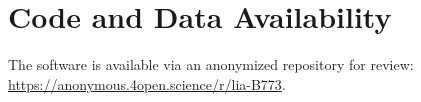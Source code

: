 \documentclass[manuscript]{acm/aamas}
\title{\PaperTitle}
\newcommand{\tool}{MEKH}
\newcommand{\toolname}{Material Evolution Knowledge Hypergraph}
\newcommand{\process}{MP-DNF}
\newcommand{\processname}{Material Processing Dependency Network Framework}
\newif\ifusecoverpage
\newcommand{\PaperAbstract}{%
Supply chain analysis for critical materials often employs top-down methods, tracing backward from finished products. These methods can lack visibility into intermediate dependencies due to proprietary manufacturing and opaque supplier networks. This paper presents a bottom-up agentic AI approach for constructing a ~\toolname{} (\tool{}), an essential building block for supply chain networks that document the transformation of raw materials into advanced technological products.

The approach uses the \processname{} (\process{}), a multi-agent system in which specialized language models iteratively discover, classify, and validate materials and industrial processes. Multiple knowledge sources are integrated via the Model Context Protocol (MCP), including harmonized trade code databases, semantic reference caches, web searches, and structured encyclopedic sources. The resulting networks are represented as directed hypergraphs that capture the multi-input, multi-output nature of industrial processes.

The pipeline begins with seed materials and expands through a documented process, identifying intermediates and transformations, and applying validation based on reference quality. Iterative cycles allow the introduction of new materials, process discovery, validation, and the removal of weakly supported links. A key feature is the explicit identification and tracking of material derivatives, which can be refined in different countries and assigned a unique, harmonized shipping code, supporting more precise supply chain tracking.

Technical contributions include: formalizing supply chain transformations using directed hypergraphs; enabling iterative bottom-up network discovery; deploying LLM agents for scalable extraction and validation; and referencing all process steps for traceability and assessment.

This framework supports mineral pathway analysis, bottleneck detection, and supply chain resilience by revealing alternatives and dependencies that are not readily apparent in top-down mapping. The pipeline, managed through a modular command-line interface, is suited to both research and operational supply chain analysis and construction.
}
\begin{document}
\ifusecoverpage
  
\fi


\pagestyle{fancy}
\fancyhead{}


\begin{abstract}
\PaperAbstract
\end{abstract}

\maketitle









\section{Code and Data Availability}

The software is available via an anonymized repository for review: \url{https://anonymous.4open.science/r/lia-B773}.





\begin{acks}
\end{acks}





 



\clearpage
\end{document}
